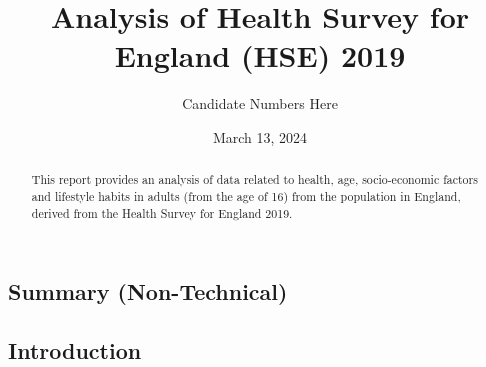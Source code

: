 \documentclass[
  11pt,
  twocolumn]{article}
\title{Analysis of Health Survey for England (HSE) 2019}
\author{Candidate Numbers Here}
\date{March 13, 2024}
\begin{document}
\maketitle
\begin{abstract}
This report provides an analysis of data related to health, age,
socio-economic factors and lifestyle habits in adults (from the age of
16) from the population in England, derived from the Health Survey for
England 2019.
\end{abstract}


\clearpage

\hypertarget{summary-non-technical}{%
\subsection{Summary (Non-Technical)}\label{summary-non-technical}}

\hypertarget{introduction}{%
\subsection{Introduction}\label{introduction}}
\end{document}
